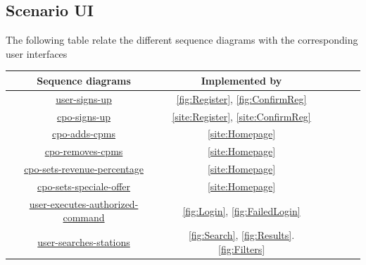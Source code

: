 \subsection{Scenario UI}
The following table relate the different sequence diagrams with the corresponding user interfaces
\begin{table}[H]
    \begin{center}
        \begin{tabular}{|c||c|c|c|c|c|}
            \hline
            Sequence diagrams                                                                                   & Implemented by                                                         \\\hline
            \hyperref[fig:user-signs-up]{user-signs-up}                                                         & \ref{fig:Register}, \ref{fig:ConfirmReg}                               \\\hline
            \hyperref[fig:cpo-signs-up]{cpo-signs-up}                                                           & \ref{site:Register}, \ref{site:ConfirmReg}                             \\\hline
            \hyperref[fig:cpo-adds-cpms]{cpo-adds-cpms}                                                         & \ref{site:Homepage}                                                    \\\hline
            \hyperref[fig:cpo-removes-cpms]{cpo-removes-cpms}                                                   & \ref{site:Homepage}                                                    \\\hline
            \hyperref[fig:cpo-sets-revenue-percentage]{cpo-sets-revenue-percentage}                             & \ref{site:Homepage}                                                    \\\hline
            \hyperref[fig:cpo-sets-speciale-offer]{cpo-sets-speciale-offer}                                     & \ref{site:Homepage}                                                    \\\hline
            \hyperref[fig:user-executes-authorized-command]{user-executes-authorized-command}                   & \ref{fig:Login}, \ref{fig:FailedLogin}                                 \\\hline
            \hyperref[fig:user-searches-stations]{user-searches-stations}                                       & \ref{fig:Search}, \ref{fig:Results}.\ref{fig:Filters}                  \\\hline

\end{tabular}
\end{center}
\end{table}
